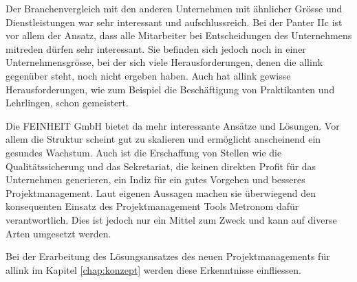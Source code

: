 Der Branchenvergleich mit den anderen Unternehmen mit ähnlicher Grösse und
Dienstleistungen war sehr interessant und aufschlussreich. Bei der Panter IIc
ist vor allem der Ansatz, dass alle Mitarbeiter bei Entscheidungen des 
Unternehmens mitreden dürfen sehr interessant. Sie befinden sich jedoch noch
in einer Unternehmensgrösse, bei der sich viele Herausforderungen, denen die allink 
gegenüber steht, noch nicht ergeben haben. Auch hat allink gewisse Herausforderungen,
wie zum Beispiel die Beschäftigung von Praktikanten und Lehrlingen, schon gemeistert.

Die FEINHEIT GmbH bietet da mehr interessante Ansätze und Lösungen. Vor allem
die Struktur scheint gut zu skalieren und ermöglicht anscheinend ein gesundes Wachstum.
Auch ist die Erschaffung von Stellen wie die Qualitätssicherung und das Sekretariat,
die keinen direkten Profit für das Unternehmen generieren, ein Indiz für ein
gutes Vorgehen und besseres Projektmanagement. Laut eigenen Aussagen machen sie
überwiegend den konsequenten Einsatz des Projektmanagement Tools Metronom dafür
verantwortlich. Dies ist jedoch nur ein Mittel zum Zweck und kann auf
diverse Arten umgesetzt werden.

Bei der Erarbeitung des Lösungsansatzes des neuen Projektmanagements für allink 
im Kapitel \ref{chap:konzept} werden diese Erkenntnisse einfliessen.

